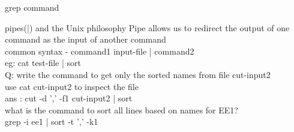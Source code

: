 \documentclass{beamer}
\begin{document}
{\begin{frame}{grep command}
\end{frame}
\begin{frame}{pipes(|) and the Unix philosophy}
	Pipe allows us to redirect the output of one command as the input of another command\\ 
	common syntax -   command1 input-file | command2 \\
	eg: cat test-file | sort \\
	Q: write the command to get only the sorted names from file cut-input2\\
	use cat cut-input2 to inspect the file\\ \pause
	ans : cut -d ',' -f1 cut-input2 | sort \\
	what is the command to sort all lines based on names for EE1?\\ \pause
	grep -i ee1 | sort -t ',' -k1 


\end{frame}
}
\end{document}

